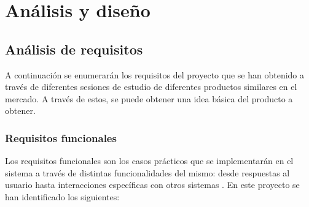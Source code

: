 \documentclass{subfiles}
\begin{document}
    \chapter{Análisis y diseño}
    \label{chap:analisis_y_diseno}

        \section{Análisis de requisitos}
        \label{sec:analisis_de_requisitos}
        A continuación se enumerarán los requisitos del proyecto que se han obtenido a través de diferentes sesiones de estudio de diferentes productos similares en el mercado. A través de estos, se puede obtener una idea básica del producto a obtener.

        \subsection{Requisitos funcionales}
        \label{sec:requisitos_funcionales}

        Los requisitos funcionales son los casos prácticos que se implementarán en el sistema a través de distintas funcionalidades del mismo: desde respuestas al usuario hasta interacciones específicas con otros sistemas \cite{web:medium_requisitosfuncionalesynofuncionales}. En este proyecto se han identificado los siguientes:
\end{document}
